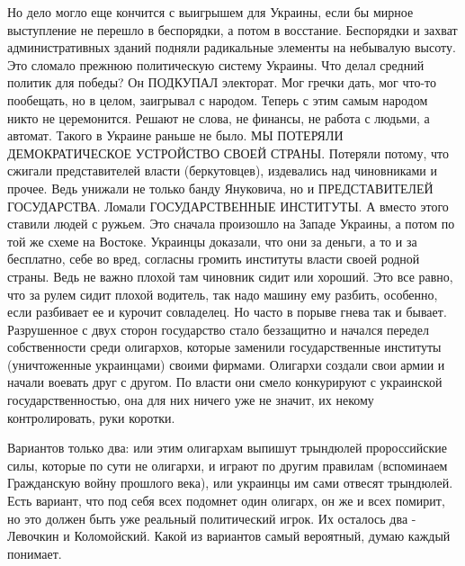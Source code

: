 Но дело могло еще кончится с выигрышем для Украины, если бы мирное выступление
не перешло в беспорядки, а потом в восстание. Беспорядки и захват
административных зданий подняли радикальные элементы на небывалую высоту. Это
сломало прежнюю политическую систему Украины. Что делал средний политик для
победы? Он ПОДКУПАЛ электорат. Мог гречки дать, мог что-то пообещать, но в
целом, заигрывал с народом. Теперь с этим самым народом никто не церемонится.
Решают не слова, не финансы, не работа с людьми, а автомат. Такого в Украине
раньше не было. МЫ ПОТЕРЯЛИ ДЕМОКРАТИЧЕСКОЕ УСТРОЙСТВО СВОЕЙ СТРАНЫ. Потеряли
потому, что сжигали представителей власти (беркутовцев), издевались над
чиновниками и прочее. Ведь унижали не только банду Януковича, но и
ПРЕДСТАВИТЕЛЕЙ ГОСУДАРСТВА. Ломали ГОСУДАРСТВЕННЫЕ ИНСТИТУТЫ. А вместо этого
ставили людей с ружьем. Это сначала произошло на Западе Украины, а потом по той
же схеме на Востоке. Украинцы доказали, что они за деньги, а то и за бесплатно,
себе во вред, согласны громить институты власти своей родной страны. Ведь не
важно плохой там чиновник сидит    или хороший. Это все равно, что за рулем
сидит плохой водитель, так надо машину ему разбить, особенно, если разбивает ее
и курочит совладелец. Но часто в порыве гнева так и бывает. Разрушенное с двух
сторон государство стало беззащитно и начался передел собственности среди
олигархов, которые заменили государственные институты (уничтоженные украинцами)
своими фирмами. Олигархи создали свои армии и начали воевать друг с другом. По
власти они смело конкурируют с украинской государственностью, она для них
ничего уже не значит, их некому контролировать, руки коротки. 

Вариантов только два:  или этим олигархам выпишут трындюлей пророссийские силы,
которые по сути не олигархи, и играют по другим правилам (вспоминаем
Гражданскую войну прошлого века), или украинцы им сами отвесят трындюлей. Есть
вариант, что под себя всех подомнет один олигарх, он же и всех помирит, но это
должен быть уже реальный политический игрок. Их осталось два - Левочкин и
Коломойский. Какой из вариантов самый вероятный, думаю каждый понимает.

